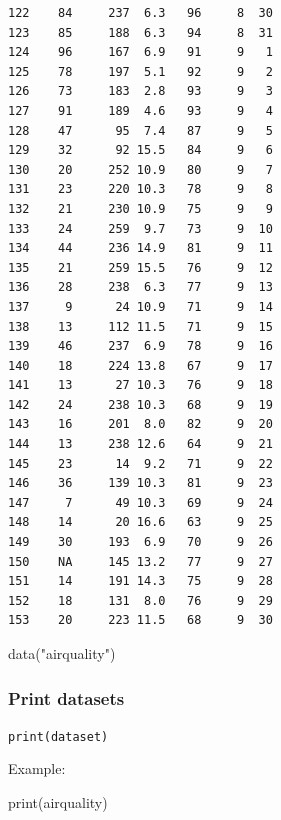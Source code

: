 \documentclass[
  letterpaper,
  DIV=11,
  numbers=noendperiod]{scrreprt}
\newenvironment{Shaded}{\begin{snugshade}}{\end{snugshade}}
\newcommand{\FunctionTok}[1]{\textcolor[rgb]{0.28,0.35,0.67}{#1}}
\newcommand{\NormalTok}[1]{\textcolor[rgb]{0.00,0.23,0.31}{#1}}
\newcommand{\StringTok}[1]{\textcolor[rgb]{0.13,0.47,0.30}{#1}}
\begin{document}
\begin{verbatim}
122    84     237  6.3   96     8  30
123    85     188  6.3   94     8  31
124    96     167  6.9   91     9   1
125    78     197  5.1   92     9   2
126    73     183  2.8   93     9   3
127    91     189  4.6   93     9   4
128    47      95  7.4   87     9   5
129    32      92 15.5   84     9   6
130    20     252 10.9   80     9   7
131    23     220 10.3   78     9   8
132    21     230 10.9   75     9   9
133    24     259  9.7   73     9  10
134    44     236 14.9   81     9  11
135    21     259 15.5   76     9  12
136    28     238  6.3   77     9  13
137     9      24 10.9   71     9  14
138    13     112 11.5   71     9  15
139    46     237  6.9   78     9  16
140    18     224 13.8   67     9  17
141    13      27 10.3   76     9  18
142    24     238 10.3   68     9  19
143    16     201  8.0   82     9  20
144    13     238 12.6   64     9  21
145    23      14  9.2   71     9  22
146    36     139 10.3   81     9  23
147     7      49 10.3   69     9  24
148    14      20 16.6   63     9  25
149    30     193  6.9   70     9  26
150    NA     145 13.2   77     9  27
151    14     191 14.3   75     9  28
152    18     131  8.0   76     9  29
153    20     223 11.5   68     9  30
\end{verbatim}

\begin{Shaded}
\begin{Highlighting}[]
\FunctionTok{data}\NormalTok{(}\StringTok{"airquality"}\NormalTok{)}
\end{Highlighting}
\end{Shaded}

\subsubsection{Print datasets}\label{print-datasets}

\texttt{print(dataset)}

Example:

\begin{Shaded}
\begin{Highlighting}[]
\FunctionTok{print}\NormalTok{(airquality)}
\end{Highlighting}
\end{Shaded}
\end{document}
